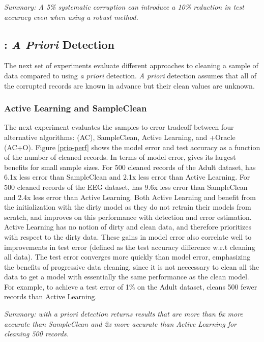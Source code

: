 \noindent \emph{Summary: A 5\% systematic corruption can introduce a 10\% reduction in test accuracy even when using a robust method.}

\subsection{\sys: \protect\textit{\large A Priori} Detection}
The next set of experiments evaluate different approaches to cleaning a sample of data compared to \sys using \emph{a priori} detection.
\emph{A priori} detection assumes that all of the corrupted records are known in advance but their clean values are unknown. 

\subsubsection{Active Learning and SampleClean}
The next experiment evaluates the samples-to-error tradeoff between four alternative algorithms: \sys (AC), SampleClean, Active Learning, and \sys+Oracle (AC+O).
Figure \ref{prio-perf} shows the model error and test accuracy as a function of the number of cleaned records.
In terms of model error, \sys gives its largest benefits for small sample sizes.
For 500 cleaned records of the Adult dataset, \sys has 6.1x less error than SampleClean and 2.1x less error than Active Learning.
For 500 cleaned records of the EEG dataset, \sys has 9.6x less error than SampleClean and 2.4x less error than Active Learning.
Both Active Learning and \sys benefit from the initialization with the dirty model as they do not retrain their models from scratch, and \sys improves on this performance with detection and error estimation.
Active Learning has no notion of dirty and clean data, and therefore prioritizes with respect to the dirty data.
These gains in model error also correlate well to improvements in test error (defined as the test accuracy difference w.r.t cleaning all data).
The test error converges more quickly than model error, emphasizing the benefits of progressive data cleaning, since it is not neccessary to clean all the data to get a model with essentially the same performance as the clean model.
For example, to achieve a test error of 1\% on the Adult dataset, \sys cleans 500 fewer records than Active Learning.


\vspace{0.25em}

\noindent \emph{Summary: \sys with a priori detection returns results that are more than 6x more accurate than SampleClean and 2x more accurate than Active Learning for cleaning 500 records.}

